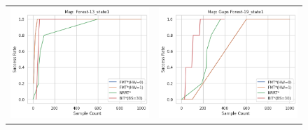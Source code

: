 \documentclass{article}
\begin{document}
\begin{figure}
{\begin{tabular}{cc}
			\includegraphics[scale=0.45]{srVsc_Forest-13_state1.png} & \includegraphics[scale=0.45]{srVsc_Gaps Forest-19_state1.png}    \\

\end{tabular}}
\end{figure}
\end{document}
